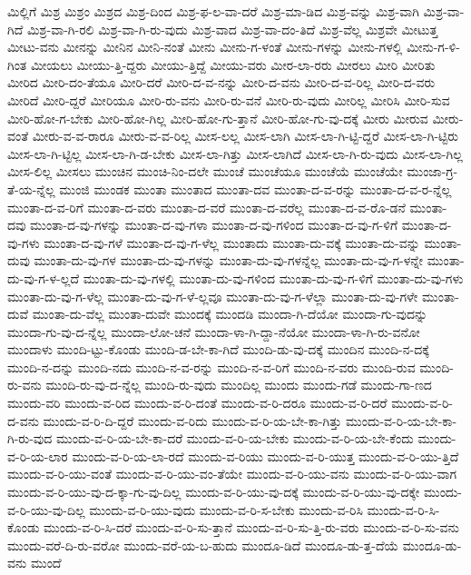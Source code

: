 {ಮಿಲ್ಲಿಗೆ
ಮಿಶ್ರ
ಮಿಶ್ರಂ
ಮಿಶ್ರದ
ಮಿಶ್ರ-ದಿಂದ
ಮಿಶ್ರ-ಫ-ಲ-ವಾ-ದರೆ
ಮಿಶ್ರ-ಮಾ-ಡಿದ
ಮಿಶ್ರ-ವನ್ನು
ಮಿಶ್ರ-ವಾಗಿ
ಮಿಶ್ರ-ವಾ-ಗಿದೆ
ಮಿಶ್ರ-ವಾ-ಗಿ-ರಲಿ
ಮಿಶ್ರ-ವಾ-ಗಿ-ರು-ವುದು
ಮಿಶ್ರ-ವಾದ
ಮಿಶ್ರ-ವಾ-ದಂ-ತಿದೆ
ಮಿಶ್ರ-ವೆಲ್ಲ
ಮಿಶ್ರವೇ
ಮೀಟುತ್ತ
ಮೀಟು-ವನು
ಮೀನನ್ನು
ಮೀನಿನ
ಮೀನಿ-ನಂತೆ
ಮೀನು
ಮೀನು-ಗ-ಳಂತೆ
ಮೀನು-ಗಳನ್ನು
ಮೀನು-ಗಳಲ್ಲಿ
ಮೀನು-ಗ-ಳಿ-ಗಿಂತ
ಮೀಯಲು
ಮೀಯು-ತ್ತಿ-ದ್ದರು
ಮೀಯು-ತ್ತಿದ್ದೆ
ಮೀಯು-ವರು
ಮೀರ-ಲಾ-ರರು
ಮೀರಲು
ಮೀರಿ
ಮೀರಿತು
ಮೀರಿದ
ಮೀರಿ-ದಂ-ತೆಯೂ
ಮೀರಿ-ದರೆ
ಮೀರಿ-ದ-ವ-ನನ್ನು
ಮೀರಿ-ದ-ವನು
ಮೀರಿ-ದ-ವ-ರಿಲ್ಲ
ಮೀರಿ-ದ-ವರು
ಮೀರಿದೆ
ಮೀರಿ-ದ್ದರೆ
ಮೀರಿಯೂ
ಮೀರಿ-ರು-ವನು
ಮೀರಿ-ರು-ವನೆ
ಮೀರಿ-ರು-ವುದು
ಮೀರಿಲ್ಲ
ಮೀರಿಸಿ
ಮೀರಿ-ಸುವ
ಮೀರಿ-ಹೋ-ಗ-ಬೇಕು
ಮೀರಿ-ಹೋ-ಗಿಲ್ಲ
ಮೀರಿ-ಹೋ-ಗು-ತ್ತಾನೆ
ಮೀರಿ-ಹೋ-ಗು-ವು-ದಕ್ಕೆ
ಮೀರು
ಮೀರುವ
ಮೀರು-ವಂತೆ
ಮೀರು-ವ-ವ-ರಾರೂ
ಮೀರು-ವ-ವ-ರಿಲ್ಲ
ಮೀಸ-ಲಲ್ಲ
ಮೀಸ-ಲಾಗಿ
ಮೀಸ-ಲಾ-ಗಿ-ಟ್ಟಿ-ದ್ದರೆ
ಮೀಸ-ಲಾ-ಗಿ-ಟ್ಟಿರು
ಮೀಸ-ಲಾ-ಗಿ-ಟ್ಟಿಲ್ಲ
ಮೀಸ-ಲಾ-ಗಿ-ಡ-ಬೇಕು
ಮೀಸ-ಲಾ-ಗಿತ್ತು
ಮೀಸ-ಲಾಗಿದೆ
ಮೀಸ-ಲಾ-ಗಿ-ರು-ವುದು
ಮೀಸ-ಲಾ-ಗಿಲ್ಲ
ಮೀಸ-ಲಿಲ್ಲ
ಮೀಸಲು
ಮುಂಚಿನ
ಮುಂಚಿ-ನಿಂ-ದಲೇ
ಮುಂಚೆ
ಮುಂಚೆಯೂ
ಮುಂಚೆಯೆ
ಮುಂಚೆಯೇ
ಮುಂಜಾ-ಗ್ರ-ತೆ-ಯ-ನ್ನೆಲ್ಲ
ಮುಂಜಿ
ಮುಂಡಕ
ಮುಂತಾ
ಮುಂತಾದ
ಮುಂತಾ-ದವ
ಮುಂತಾ-ದ-ವ-ರನ್ನು
ಮುಂತಾ-ದ-ವ-ರ-ನ್ನೆಲ್ಲ
ಮುಂತಾ-ದ-ವ-ರಿಗೆ
ಮುಂತಾ-ದ-ವರು
ಮುಂತಾ-ದ-ವರೆ
ಮುಂತಾ-ದ-ವರೆಲ್ಲ
ಮುಂತಾ-ದ-ವ-ರೊ-ಡನೆ
ಮುಂತಾ-ದವು
ಮುಂತಾ-ದ-ವು-ಗಳನ್ನು
ಮುಂತಾ-ದ-ವು-ಗಳಾ
ಮುಂತಾ-ದ-ವು-ಗಳಿಂದ
ಮುಂತಾ-ದ-ವು-ಗ-ಳಿಗೆ
ಮುಂತಾ-ದ-ವು-ಗಳು
ಮುಂತಾ-ದ-ವು-ಗಳೆ
ಮುಂತಾ-ದ-ವು-ಗ-ಳೆಲ್ಲ
ಮುಂತಾದು
ಮುಂತಾ-ದು-ವಕ್ಕೆ
ಮುಂತಾ-ದು-ವನ್ನು
ಮುಂತಾ-ದುವು
ಮುಂತಾ-ದು-ವು-ಗಳ
ಮುಂತಾ-ದು-ವು-ಗಳನ್ನು
ಮುಂತಾ-ದು-ವು-ಗಳನ್ನೆಲ್ಲ
ಮುಂತಾ-ದು-ವು-ಗ-ಳನ್ನೇ
ಮುಂತಾ-ದು-ವು-ಗ-ಳ-ಲ್ಲದೆ
ಮುಂತಾ-ದು-ವು-ಗಳಲ್ಲಿ
ಮುಂತಾ-ದು-ವು-ಗಳಿಂದ
ಮುಂತಾ-ದು-ವು-ಗ-ಳಿಗೆ
ಮುಂತಾ-ದು-ವು-ಗಳು
ಮುಂತಾ-ದು-ವು-ಗ-ಳೆಲ್ಲ
ಮುಂತಾ-ದು-ವು-ಗ-ಳೆ-ಲ್ಲವೂ
ಮುಂತಾ-ದು-ವು-ಗ-ಳೆಲ್ಲಾ
ಮುಂತಾ-ದು-ವು-ಗಳೇ
ಮುಂತಾ-ದುವೆ
ಮುಂತಾ-ದು-ವೆಲ್ಲ
ಮುಂತಾ-ದುವೇ
ಮುಂದಕ್ಕೆ
ಮುಂದಡಿ
ಮುಂದಾ-ಗಿ-ದೆಯೋ
ಮುಂದಾ-ಗು-ವುದನ್ನು
ಮುಂದಾ-ಗು-ವು-ದ-ನ್ನೆಲ್ಲ
ಮುಂದಾ-ಲೋ-ಚನೆ
ಮುಂದಾ-ಳಾ-ಗಿ-ದ್ದಾ-ನೆಯೋ
ಮುಂದಾ-ಳಾ-ಗಿ-ರು-ವನೋ
ಮುಂದಾಳು
ಮುಂದಿ-ಟ್ಟು-ಕೊಂಡು
ಮುಂದಿ-ಡ-ಬೇ-ಕಾ-ಗಿದೆ
ಮುಂದಿ-ಡು-ವು-ದಕ್ಕೆ
ಮುಂದಿನ
ಮುಂದಿ-ನ-ದಕ್ಕೆ
ಮುಂದಿ-ನ-ದನ್ನು
ಮುಂದಿ-ನದು
ಮುಂದಿ-ನ-ವ-ರನ್ನು
ಮುಂದಿ-ನ-ವ-ರಿಗೆ
ಮುಂದಿ-ನ-ವರು
ಮುಂದಿ-ರುವ
ಮುಂದಿ-ರು-ವನು
ಮುಂದಿ-ರು-ವು-ದ-ನ್ನೆಲ್ಲ
ಮುಂದಿ-ರು-ವುದು
ಮುಂದಿಲ್ಲ
ಮುಂದು
ಮುಂದು-ಗಡೆ
ಮುಂದು-ಗಾ-ಣದ
ಮುಂದು-ವರಿ
ಮುಂದು-ವ-ರಿದ
ಮುಂದು-ವ-ರಿ-ದಂತೆ
ಮುಂದು-ವ-ರಿ-ದರೂ
ಮುಂದು-ವ-ರಿ-ದರೆ
ಮುಂದು-ವ-ರಿ-ದ-ವನು
ಮುಂದು-ವ-ರಿ-ದಿ-ದ್ದರೆ
ಮುಂದು-ವ-ರಿದು
ಮುಂದು-ವ-ರಿ-ಯ-ಬೇ-ಕಾ-ಗಿತ್ತು
ಮುಂದು-ವ-ರಿ-ಯ-ಬೇ-ಕಾ-ಗಿ-ರು-ವುದ
ಮುಂದು-ವ-ರಿ-ಯ-ಬೇ-ಕಾ-ದರೆ
ಮುಂದು-ವ-ರಿ-ಯ-ಬೇಕು
ಮುಂದು-ವ-ರಿ-ಯ-ಬೇ-ಕೆಂದು
ಮುಂದು-ವ-ರಿ-ಯ-ಲಾರ
ಮುಂದು-ವ-ರಿ-ಯ-ಲಾ-ರದೆ
ಮುಂದು-ವ-ರಿಯು
ಮುಂದು-ವ-ರಿ-ಯುತ್ತ
ಮುಂದು-ವ-ರಿ-ಯು-ತ್ತಿದೆ
ಮುಂದು-ವ-ರಿ-ಯು-ವಂತೆ
ಮುಂದು-ವ-ರಿ-ಯು-ವಂ-ತೆಯೇ
ಮುಂದು-ವ-ರಿ-ಯು-ವನು
ಮುಂದು-ವ-ರಿ-ಯು-ವಾಗ
ಮುಂದು-ವ-ರಿ-ಯು-ವು-ದ-ಕ್ಕಾ-ಗು-ವು-ದಿಲ್ಲ
ಮುಂದು-ವ-ರಿ-ಯು-ವು-ದಕ್ಕೆ
ಮುಂದು-ವ-ರಿ-ಯು-ವು-ದಕ್ಕೇ
ಮುಂದು-ವ-ರಿ-ಯು-ವು-ದಿಲ್ಲ
ಮುಂದು-ವ-ರಿ-ಯು-ವುದು
ಮುಂದು-ವ-ರಿ-ಸ-ಬೇಕು
ಮುಂದು-ವ-ರಿಸಿ
ಮುಂದು-ವ-ರಿ-ಸಿ-ಕೊಂಡು
ಮುಂದು-ವ-ರಿ-ಸಿ-ದರೆ
ಮುಂದು-ವ-ರಿ-ಸು-ತ್ತಾನೆ
ಮುಂದು-ವ-ರಿ-ಸು-ತ್ತಿ-ರು-ವರು
ಮುಂದು-ವ-ರಿ-ಸು-ವನು
ಮುಂದು-ವರೆ-ದಿ-ರು-ವರೋ
ಮುಂದು-ವರೆ-ಯ-ಬ-ಹುದು
ಮುಂದೂ-ಡಿದೆ
ಮುಂದೂ-ಡು-ತ್ತ-ದೆಯೆ
ಮುಂದೂ-ಡು-ವನು
ಮುಂದೆ
}
